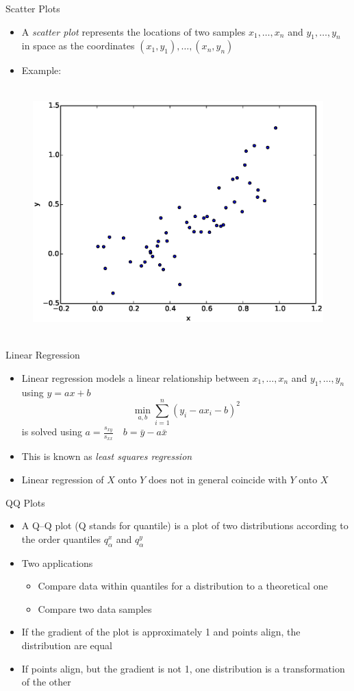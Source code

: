 \documentclass{beamer}
\begin{document}
\begin{frame}{Scatter Plots} 
\begin{itemize}
 \item A \emph{scatter plot} represents the locations of two samples $x_1, \ldots, x_n$ and $y_1, \ldots, y_n$ in space as the coordinates $(x_1, y_1), \ldots, (x_n, y_n)$ 
 \item Example: 
\end{itemize}
  \begin{figure}[htp]
\mbox{
\includegraphics[width=0.5\linewidth]{ScatterPlot.eps}
}
\end{figure} 
\end{frame}

\begin{frame}{Linear Regression} 
\begin{itemize} 
 \item Linear regression models a linear relationship between $x_1, \ldots, x_n$ and $y_1, \ldots, y_n$ using $y = ax + b$ 
 \begin{displaymath} 
  \min_{a, b} \sum_{i=1}^n (y_i  - a x_i - b)^2 
 \end{displaymath}
 is solved using $a = \frac{s_{xy}}{s_{xx}} \quad b = \bar{y} - a\bar{x}$
 \item This is known as \emph{least squares regression}
\item Linear regression of $X$ onto $Y$ does not in general coincide with $Y$ onto $X$ 
 \end{itemize}
\end{frame}

\begin{frame}{QQ Plots} 
\begin{itemize}
 \item A Q–Q plot (Q stands for quantile) is a plot of two distributions according to the order quantiles $q_\alpha^x$ and $q_\alpha^y$
 \item Two applications 
 \begin{itemize}
 \item Compare data within quantiles for a distribution to a theoretical one 
 \item Compare two data samples 
 \end{itemize}
 \item If the gradient of the plot is approximately 1 and points align, the distribution are equal 
 \item If points align, but the gradient is not 1, one distribution is a transformation of the other 
\end{itemize}
\end{frame}
\end{document}
